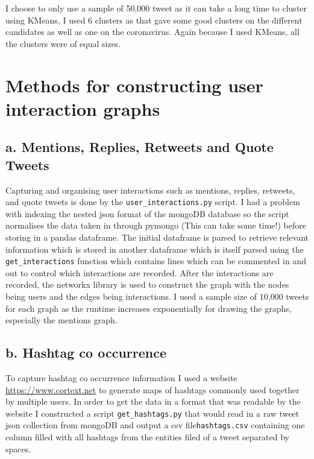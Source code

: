 \documentclass[10pt,a4paper]{article}
\begin{document}
I choose to only use a sample of 50,000 tweet as it can take a long time to cluster using KMeans, I used 6 clusters as that gave some good clusters on the different candidates as well as one on the coronavirus. Again because I used KMeans, all the clusters were of equal sizes.

\section{Methods for constructing user interaction graphs}
\subsection*{a. Mentions, Replies, Retweets and Quote Tweets}
	Capturing and organising user interactions such as mentions, replies, retweets, and quote tweets is done by the \verb|user_interactions.py| script. I had a problem with indexing the nested json format of the mongoDB database so the script normalises the data taken in through pymongo (This can take some time!) before storing in a pandas dataframe. The initial dataframe is parsed to retrieve relevant information which is stored in another dataframe which is itself parsed using the \verb|get_interactions| function which contains lines which can be commented in and out to control which interactions are recorded. After the interactions are recorded, the networkx library is used to construct the graph with the nodes being users and the edges being interactions. I used a sample size of 10,000 tweets for each graph as the runtime increases exponentially for drawing the graphs, especially the mentions graph.
	
\subsection*{b. Hashtag co occurrence}	

	To capture hashtag co occurrence information I used a website \url{https://www.cortext.net} to generate maps of hashtags commonly used together by multiple users. In order to get the data in a format that was readable by the website I constructed a script \verb|get_hashtags.py| that would read in a raw tweet json collection from mongoDB and output a csv file\verb|hashtags.csv| containing one column filled with all hashtags from the entities filed of a tweet separated by spaces.
	
\end{document}
